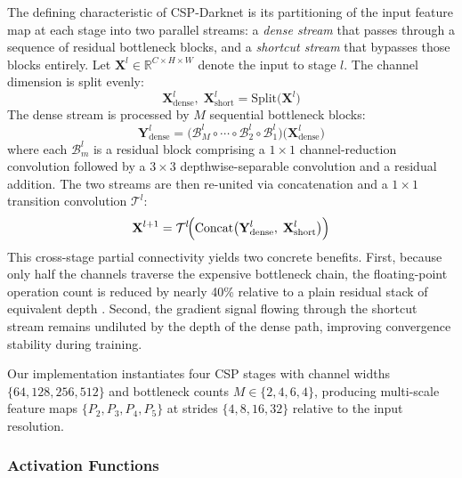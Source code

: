 The defining characteristic of CSP-Darknet is its partitioning
of the input feature map at each stage into two parallel
streams: a \textit{dense stream} that passes through a
sequence of residual bottleneck blocks, and a \textit{shortcut
stream} that bypasses those blocks entirely. Let
$\mathbf{X}^{l} \in \mathbb{R}^{C \times H \times W}$ denote
the input to stage $l$. The channel dimension is split evenly:
\begin{equation}
    \mathbf{X}_{\text{dense}}^{l},\;
    \mathbf{X}_{\text{short}}^{l}
    = \text{Split}\!\bigl(\mathbf{X}^{l}\bigr)
    \label{eq:csp_split}
\end{equation}
The dense stream is processed by $M$ sequential bottleneck
blocks:
\begin{equation}
    \mathbf{Y}_{\text{dense}}^{l}
    = \bigl(\mathcal{B}_{M}^{l} \circ \cdots \circ
      \mathcal{B}_{2}^{l} \circ
      \mathcal{B}_{1}^{l}\bigr)
      \bigl(\mathbf{X}_{\text{dense}}^{l}\bigr)
    \label{eq:csp_dense}
\end{equation}
where each $\mathcal{B}_{m}^{l}$ is a residual block
comprising a $1 \times 1$ channel-reduction convolution followed
by a $3 \times 3$ depthwise-separable convolution
\cite{howard2017mobilenets} and a residual addition. The two
streams are then re-united via concatenation and a $1 \times 1$
transition convolution $\mathcal{T}^{l}$:
\begin{equation}
    \mathbf{X}^{l+1}
    = \mathcal{T}^{l}\!\Bigl(
        \text{Concat}\bigl(
            \mathbf{Y}_{\text{dense}}^{l},\;
            \mathbf{X}_{\text{short}}^{l}
        \bigr)
      \Bigr)
    \label{eq:csp_merge}
\end{equation}
This cross-stage partial connectivity yields two concrete
benefits. First, because only half the channels traverse the
expensive bottleneck chain, the floating-point operation count
is reduced by nearly 40\% relative to a plain residual stack of
equivalent depth \cite{wang2020cspnet}. Second, the gradient
signal flowing through the shortcut stream remains undiluted by
the depth of the dense path, improving convergence stability
during training.

Our implementation instantiates four CSP stages with channel
widths $\{64, 128, 256, 512\}$ and bottleneck counts
$M \in \{2, 4, 6, 4\}$, producing multi-scale feature maps
$\{P_2, P_3, P_4, P_5\}$ at strides $\{4, 8, 16, 32\}$
relative to the input resolution.

\subsubsection{Activation Functions}

